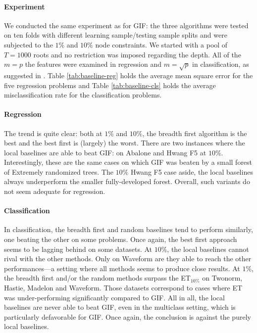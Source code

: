 \documentclass{article}
\begin{document}
\paragraph{Experiment}
We conducted the same experiment as for GIF: the three algorithms were tested 
on ten folds with different learning sample/testing sample splits and were 
subjected to the $1\%$ and $10\%$ node constraints. We started with a pool of 
$T=1000$ roots and no restriction was imposed regarding the depth. All of the 
$m=p$ the features were examined in regression and $m=\sqrt{p}$ in 
classification, as suggested in \cite{extratrees}. Table \ref{tab:baseline-reg} 
holds the average mean square error for the five regression problems and Table 
\ref{tab:baseline-cls} holds the average misclassification rate for the 
classification problems.

\paragraph{Regression}
The trend is quite clear: both at $1\%$ and $10\%$, the breadth first algorithm 
is the best and the best first is (largely) the worst. 
There are two instances where the local baselines are able to beat GIF: on 
Abalone and Hwang F5 at $10\%$. Interestingly, these are the same cases on 
which GIF was beaten by a small forest of Extremely randomized trees. The 
$10\%$ Hwang F5 case aside, the local baselines always underperform the smaller 
fully-developed forest. Overall, such variants do not seem adequate for 
regression.

\paragraph{Classification}
In classification, the breadth first and random baselines tend to perform 
similarly, one beating the other on some problems. Once again, the best first 
approach seems to be lagging behind on some datasets. At $10\%$, the local 
baselines cannot rival with the other methods. Only on Waveform are they able 
to reach the other performances---a setting where all methods seems to produce 
close results. At $1\%$, the breadth first and/or the random methods surpass 
the ET$_{10\%}$ on Twonorm, Hastie, Madelon and Waveform. Those datasets 
correspond to cases where ET was under-performing significantly compared to GIF. 
All in all, the local baselines are never able to beat GIF, even in the 
multiclass setting, which is particularly defavorable for GIF. Once again, the 
conclusion is against the purely local baselines.
\end{document}
